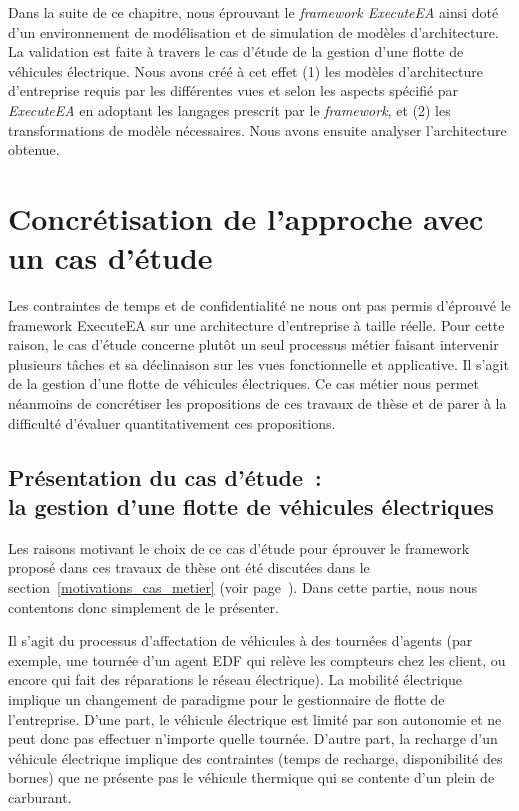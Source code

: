     Dans la suite de ce chapitre, nous éprouvant le \emph{framework ExecuteEA}
    ainsi doté d'un environnement de modélisation et de simulation de modèles
    d'architecture. La validation est faite à travers le cas d'étude de la
    gestion d'une flotte de véhicules électrique. Nous avons créé à cet effet
    (1) les modèles d'architecture d'entreprise requis par les différentes vues
    et selon les aspects spécifié par \emph{ExecuteEA} en adoptant les langages
    prescrit par le \emph{framework}, et (2) les transformations de modèle
    nécessaires. Nous avons ensuite analyser l'architecture obtenue.


\section{Concrétisation de l'approche avec un cas d'étude}

    Les contraintes de temps et de confidentialité ne nous ont pas permis
    d'éprouvé le framework ExecuteEA sur une architecture d'entreprise à taille
    réelle. Pour cette raison, le cas d'étude concerne plutôt un seul processus
    métier faisant intervenir plusieurs tâches et sa déclinaison sur les vues
    fonctionnelle et applicative. Il s'agit de la gestion d'une flotte de
    véhicules électriques. Ce cas métier nous permet néanmoins de concrétiser
    les propositions de ces travaux de thèse et de parer à la difficulté
    d'évaluer quantitativement ces propositions.

    \subsection{Présentation du cas d'étude~:\\la gestion d'une flotte de véhicules électriques}

    Les raisons motivant le choix de ce cas d'étude pour éprouver le framework
    proposé dans ces travaux de thèse ont été discutées dans le
    section~\ref{motivations_cas_metier} (voir
    page~\pageref{motivations_cas_metier}).  Dans cette partie, nous nous
    contentons donc simplement de le présenter.

    Il s'agit du processus d'affectation de véhicules à des tournées d'agents
    (par exemple, une tournée d'un agent EDF qui relève les compteurs chez les
    client, ou encore qui fait des réparations le réseau électrique).  La
    mobilité électrique implique un changement de paradigme pour le gestionnaire
    de flotte de l'entreprise. D'une part, le véhicule électrique est limité par
    son autonomie et ne peut donc pas effectuer n'importe quelle tournée.
    D'autre part, la recharge d'un véhicule électrique implique des contraintes
    (temps de recharge, disponibilité des bornes) que ne présente pas le
    véhicule thermique qui se contente d'un plein de carburant.
    
